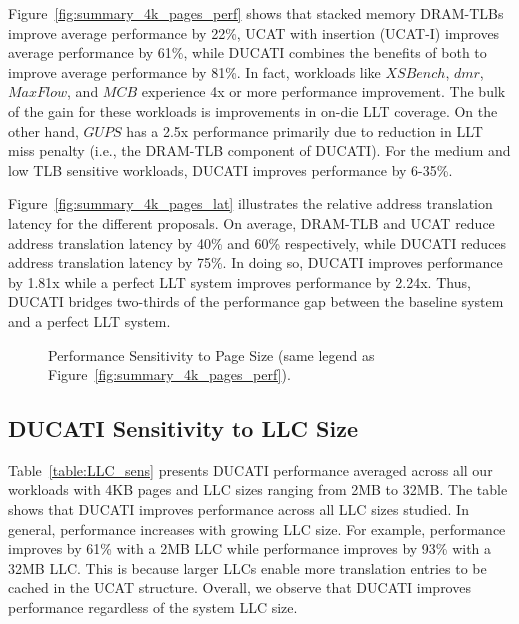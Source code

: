 Figure~\ref{fig:summary_4k_pages_perf} shows that stacked memory
DRAM-TLBs improve average performance by 22\%, UCAT with insertion
(UCAT-I) improves average performance by 61\%, while DUCATI combines
the benefits of both to improve average performance by 81\%. In fact,
workloads like $XSBench$, $dmr$, $MaxFlow$, and $MCB$ experience 4x or
more performance improvement. The bulk of the gain for these workloads
is improvements in on-die LLT coverage. On the other hand, $GUPS$ has
a 2.5x performance primarily due to reduction in LLT miss penalty
(i.e., the DRAM-TLB component of DUCATI). For the medium and low TLB
sensitive workloads, DUCATI improves performance by 6-35\%.

Figure~\ref{fig:summary_4k_pages_lat} illustrates the relative address
translation latency for the different proposals. On average, DRAM-TLB
and UCAT reduce address translation latency by 40\% and 60\%
respectively, while DUCATI reduces address translation latency by
75\%. In doing so, DUCATI improves performance by 1.81x while a
perfect LLT system improves performance by 2.24x. Thus, DUCATI bridges
two-thirds of the performance gap between the baseline system and a
perfect LLT system.

\begin{figure}[b] 
\vspace{0.2 in} \centering
\centerline{}

\caption{\small Performance Sensitivity to Page Size (same legend as
Figure~\ref{fig:summary_4k_pages_perf}). \normalsize}

\label{fig:summary_pagesize} 
\vspace{-0.1 in}
\end{figure}



\subsection{DUCATI Sensitivity to LLC Size}

\noindent Table~\ref{table:LLC_sens} presents DUCATI performance
averaged across all our workloads with 4KB pages and LLC sizes ranging
from 2MB to 32MB. The table shows that DUCATI improves performance
across all LLC sizes studied. In general, performance increases with
growing LLC size. For example, performance improves by 61\% with a 2MB
LLC while performance improves by 93\% with a 32MB LLC. This is
because larger LLCs enable more translation entries to be cached in
the UCAT structure. Overall, we observe that DUCATI improves
performance regardless of the system LLC size.

